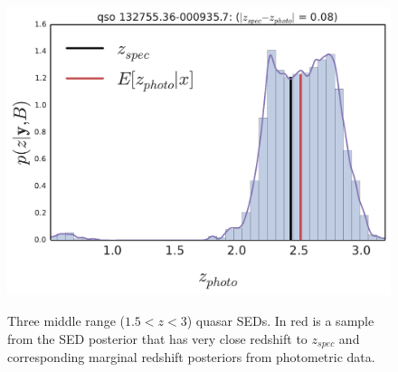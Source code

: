 \documentclass{article}
\begin{document}
\begin{figure}[t]
{\includegraphics[width=.56\columnwidth]{../../figs/quasar_plots/close_mid/quasar_1959_posterior_z}
}
\vskip -0.2in
\caption{ Three middle range ($1.5 < z < 3$) quasar SEDs.  In red is a sample from the SED posterior that has very close redshift to $z_{spec}$ and corresponding marginal redshift posteriors from photometric data. }
\label{fig:recon}
\vskip -0.2in
\end{figure}
\clearpage
\end{document}
